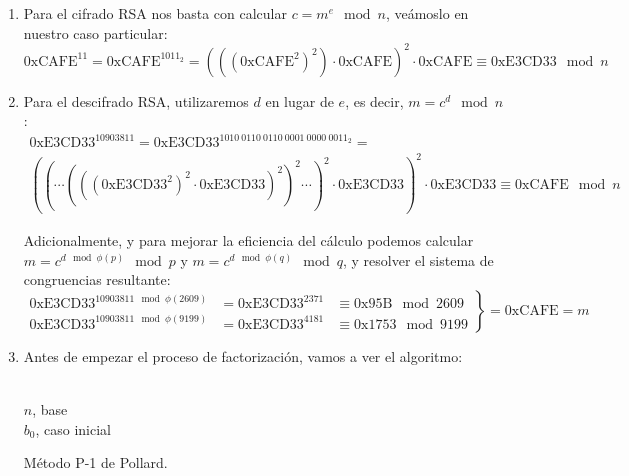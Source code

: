 	\begin{enumerate}
		\item Para el cifrado RSA nos basta con calcular $c = m^e \mod n$, veámoslo en nuestro caso particular:
		$$\mathrm{0xCAFE}^{11} = \mathrm{0xCAFE}^{1011_2} = \left(\left(\left(\mathrm{0xCAFE}^2\right)^2\right)
		\cdot \mathrm{0xCAFE}\right)^2 \cdot \mathrm{0xCAFE} \equiv \mathrm{0xE3CD33} \mod n$$
		
		\item Para el descifrado RSA, utilizaremos $d$ en lugar de $e$, es decir, $m = c^d \mod n$: \\
		\begin{gather*}
			\mathrm{0xE3CD33}^{10903811} = \mathrm{0xE3CD33}^{1010\ 0110\ 0110\ 0001\ 0000\ 0011_2} = \\
			\left(\left( \cdots \left(\left(\left(\mathrm{0xE3CD33}^2\right)^2 \cdot \mathrm{0xE3CD33}
			\right)^2\right)^2 \cdots \right)^2 \cdot \mathrm{0xE3CD33}\right)^2 \cdot \mathrm{0xE3CD33}
			\equiv \mathrm{0xCAFE} \mod n
		\end{gather*}
		
		Adicionalmente, y para mejorar la eficiencia del cálculo podemos calcular $m = c^{d \mod \phi(p)} \mod p$
		y $m = c^{d \mod \phi(q)} \mod q$, y resolver el sistema de congruencias resultante:
		$$\left.\begin{aligned}
		        \mathrm{0xE3CD33}^{10903811 \mod \phi(2609)} &= \mathrm{0xE3CD33}^{2371} &\equiv \mathrm{0x95B} \mod 2609\\
		        \mathrm{0xE3CD33}^{10903811 \mod \phi(9199)} &= \mathrm{0xE3CD33}^{4181} &\equiv \mathrm{0x1753} \mod 9199
		       \end{aligned}
		\right\} = \mathrm{0xCAFE} = m$$
		
		\item Antes de empezar el proceso de factorización, vamos a ver el algoritmo:
		
		\begin{algorithm}[H]
			\begin{algorithmic}[1]
				\REQUIRE \ \\
					\texttt{$n$}, base\\
					\texttt{$b_0$}, caso inicial \
				\ENDWHILE
				
			\end{algorithmic}
			\caption{Método P-1 de Pollard.}
			\label{PollardP-1}
		\end{algorithm}
		

\end{enumerate}
